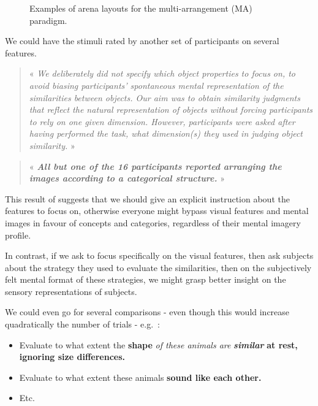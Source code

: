 \documentclass[
  authoryear]{elsarticle}
\begin{document}
\begin{figure}
\begin{minipage}{\linewidth}
{}


\end{minipage}%

\caption{\label{fig-spam-arenas}Examples of arena layouts for the
multi-arrangement (MA) paradigm.}

\end{figure}%

We could have the stimuli rated by another set of participants on
several features.

\begin{quote}
« \emph{We deliberately did not specify which object properties to focus
on, to avoid biasing participants' spontaneous mental representation of
the similarities between objects. Our aim was to obtain similarity
judgments that reflect the natural representation of objects without
forcing participants to rely on one given dimension. However,
participants were asked after having performed the task, what
dimension(s) they used in judging object similarity.} »
\citep{jozwik2016}
\end{quote}

\begin{quote}
« \textbf{\emph{All but one of the 16 participants reported arranging
the images according to a categorical structure.}} » \citep{jozwik2017}
\end{quote}

This result of \citet{jozwik2017} suggests that we should give an
explicit instruction about the features to focus on, otherwise everyone
might bypass visual features and mental images in favour of concepts and
categories, regardless of their mental imagery profile.

In contrast, if we ask to focus specifically on the visual features,
then ask subjects about the strategy they used to evaluate the
similarities, then on the subjectively felt mental format of these
strategies, we might grasp better insight on the sensory representations
of subjects.

We could even go for several comparisons - even though this would
increase quadratically the number of trials - e.g.~:

\begin{itemize}
\item
  Evaluate to what extent the \textbf{shape} \emph{of these animals are}
  \textbf{\emph{similar}} \textbf{at rest, ignoring size differences.}
\item
  Evaluate to what extent these animals \textbf{sound like each other.}
\item
  Etc.
\end{itemize}
\end{document}
